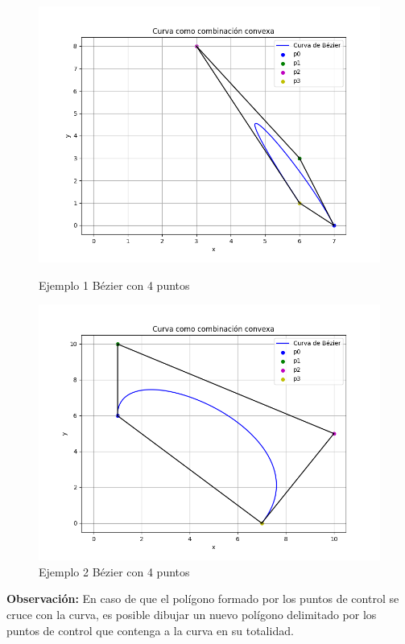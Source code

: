 \documentclass{article}
\begin{document}
\begin{figure}[H]
\begin{minipage}{0.45\textwidth}
        \centering
        \includegraphics[width=\textwidth]{imagenes/3b3.png}
        \caption{Ejemplo 1 Bézier con 4 puntos}
        \label{fig:grafico3}
    \end{minipage}
\begin{minipage}{0.45\textwidth}
        \centering
        \includegraphics[width=\textwidth]{imagenes/3b4.png}
        \caption{Ejemplo 2 Bézier con 4 puntos}
        \label{fig:grafico3}
    \end{minipage}
    \label{fig:tres_graficos}
\end{figure}

\textbf{Observación:} En caso de que el polígono formado por los puntos de control se cruce con la curva, es posible dibujar un nuevo polígono delimitado por los puntos de control que contenga a la curva en su totalidad.
\end{document}
